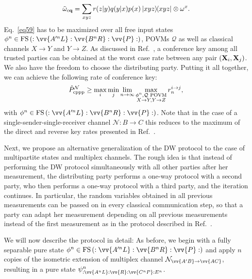 \documentclass[aps,pra,twocolumn,superscriptaddress,longbibliography]{revtex4-1}
\def\FS{\operatorname{FS}}
\def\({\left(}
\def\){\right)}
\newcommand{\mc}[1]{\mathcal{#1}}
\begin{document}
\begin{equation}
\tilde{\omega}_{c{\bf q}}=\sum_{xyz}r(z|y)q(y|x)p(x)\op{xyz}\otimes\omega^x.
\end{equation}
Eq.~\eqref{eq59} has to be maximized over all free input states $\phi^n\in\FS\(:\vv{A'^{ n}L}:\vv{B^{ n}R}:\vv{P}:\)$, POVMs $\mc{Q}$ as well as classical channels $X\to Y$ and $Y\to Z$. As discussed in Ref.~\cite{AH09}, a conference key among all trusted parties can be obtained at the worst case rate between any pair $({\bf X}_i,{\bf X}_j)$. We also have the freedom to choose the distributing party. Putting it all together, we can achieve the following rate of conference key:
\begin{equation}
\hat{P}_{\textnormal{cppp}}^{\mc{N}}\geq\max_i\min_j\lim_{n\to\infty}\max_{\substack{\phi^n,\mc{Q}\text{ POVM}\\X\to Y,Y\to Z} } r_n^{i\to j},
\label{eq:lb-star}
\end{equation}
with $\phi^n\in\FS\(:\vv{A'^{ n}L}:\vv{B^{ n}R}:\vv{P}:\)$. Note that in the case of a single-sender-single-receiver channel $\mc{N}:B\to C$ this reduces to the maximum of the direct and reverse key rates presented in Ref.~\cite{pirandola2009direct}.

Next, we propose an alternative generalization of the DW protocol to the case of multipartite states and multiplex channels. The rough idea is that instead of performing the DW protocol simultaneously with all other parties after her measurement, the distributing party performs a one-way protocol with a second party, who then performs a one-way protocol with a third party, and the iteration continues. In particular, the random variables obtained in all previous measurements can be passed on in every classical communication step, so that a party can adapt her measurement depending on all previous measurements instead of the first measurement as in the protocol described in Ref.~\cite{AH09}. 

We will now describe the protocol in detail: As before, we begin with a fully separable pure state $\phi^n\in\FS\(:\vv{A'^{ n}L}:\vv{B^{ n}R}:\vv{P}:\)$ and apply $n$ copies of the isometric extension of multiplex channel $\mc{N}_{\vv{A'B}\to\vv{AC}}$, resulting in a pure state $\psi^n_{:\vv{A^{ n}L}:\vv{R}:\vv{C^{ n}P}:E^{n}}$. 
\end{document}
